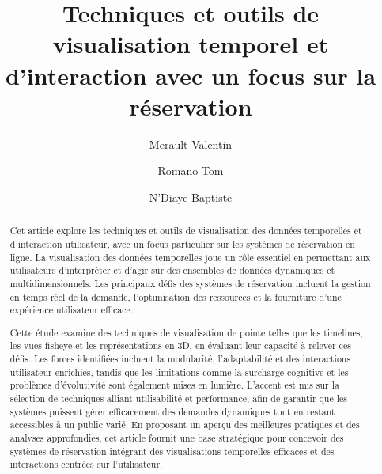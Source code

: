 \documentclass[runningheads]{llncs}
\begin{document}
%
\title{Techniques et outils de visualisation temporel et d'interaction avec un focus sur la réservation}
%
%
\author{Merault Valentin \and
Romano Tom \and
N'Diaye Baptiste}
%
%
%
\maketitle              %
%
\begin{abstract}
Cet article explore les techniques et outils de visualisation des données temporelles et d'interaction utilisateur, avec un focus particulier sur les systèmes de réservation en ligne. La visualisation des données temporelles joue un rôle essentiel en permettant aux utilisateurs d'interpréter et d'agir sur des ensembles de données dynamiques et multidimensionnels. Les principaux défis des systèmes de réservation incluent la gestion en temps réel de la demande, l'optimisation des ressources et la fourniture d'une expérience utilisateur efficace.

Cette étude examine des techniques de visualisation de pointe telles que les timelines, les vues fisheye et les représentations en 3D, en évaluant leur capacité à relever ces défis. Les forces identifiées incluent la modularité, l’adaptabilité et des interactions utilisateur enrichies, tandis que les limitations comme la surcharge cognitive et les problèmes d’évolutivité sont également mises en lumière. L'accent est mis sur la sélection de techniques alliant utilisabilité et performance, afin de garantir que les systèmes puissent gérer efficacement des demandes dynamiques tout en restant accessibles à un public varié. En proposant un aperçu des meilleures pratiques et des analyses approfondies, cet article fournit une base stratégique pour concevoir des systèmes de réservation intégrant des visualisations temporelles efficaces et des interactions centrées sur l'utilisateur.

\end{abstract}
%
%
%
\end{document}
